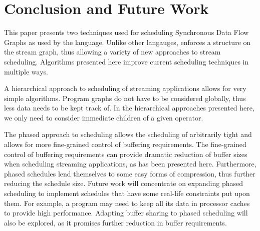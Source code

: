 \section{Conclusion and Future Work}
\label{chpt:conclusion}

This paper presents two techniques used for scheduling Synchronous
Data Flow Graphs as used by the {\StreamIt} language. Unlike other
langauges, {\StreamIt} enforces a structure on the stream graph,
thus allowing a variety of new approaches to stream scheduling.
Algorithms presented here improve current scheduling techniques in
multiple ways.

A hierarchical approach to scheduling of streaming applications
allows for very simple algorithms. Program graphs do not have to
be considered globally, thus less data needs to be kept track of.
In the hierarchical approaches presented here, we only need to
consider immediate children of a given operator.

The phased approach to scheduling allows the scheduling of
arbitrarily tight {\feedbackloops} and allows for more
fine-grained control of buffering requirements. The fine-grained
control of buffering requirements can provide dramatic reduction
of buffer sizes when scheduling streaming applications, as has
been presented here. Furthermore, phased schedules lend themselves
to some easy forms of compression, thus further reducing the
schedule size. Future work will concentrate on expanding phased
scheduling to implement schedules that have some real-life
constraints put upon them. For example, a program may need to keep
all its data in processor caches to provide high performance.
Adapting buffer sharing to phased scheduling will also be
explored, as it promises further reduction in buffer requirements.
